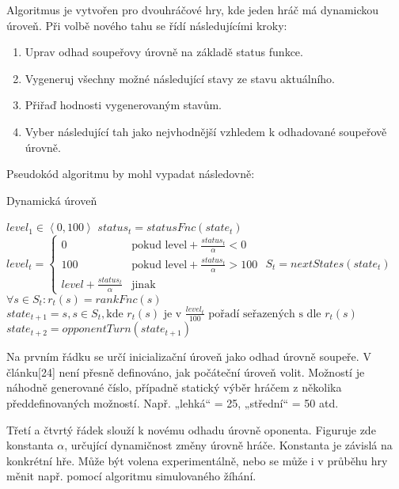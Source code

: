 Algoritmus je vytvořen pro dvouhráčové hry, kde jeden hráč má dynamickou úroveň. Při volbě nového tahu se řídí následujícími kroky:


\begin{enumerate}
	\item Uprav odhad soupeřovy úrovně na základě status funkce.
	\item Vygeneruj všechny možné následující stavy ze stavu aktuálního.
	\item Přiřaď hodnosti vygenerovaným stavům.
	\item Vyber následující tah jako nejvhodnější vzhledem k odhadované soupeřově úrovně.
\end{enumerate}

Pseudokód algoritmu by mohl vypadat následovně:

\begin{algorithm}
\caption{Dynamická úroveň}
\label{alg-dynlevel}
\begin{algorithmic}[1]
\State $level_1 \in \left\langle 0, 100 \right\rangle$
	 \State $status_t = statusFnc(state_t)$
	 \State $level_t = \begin{cases}
											  0 & \text{pokud level} + \frac{status_t}{\alpha} < 0 \\
												100 & \text{pokud level} + \frac{status_t}{\alpha} > 100 \\
												level + \frac{status_t}{\alpha}  & \text{jinak}
										 \end{cases}
						 $
   \State $S_t = nextStates(state_t)$
	 \State $\forall s \in S_t : r_t(s) = rankFnc(s)$
	 \State $state_{t+1} = s, s \in S_t, \text{kde } r_t(s) \text{ je v } \frac{level_t}{100} \text{ pořadí seřazených s dle } r_t(s)$
	 \State $state_{t+2} = opponentTurn(state_{t+1})$
\EndFor
\end{algorithmic}
\end{algorithm}

Na prvním řádku se určí inicializační úroveň jako odhad úrovně soupeře. V článku[24] není přesně definováno, jak počáteční úroveň volit. Možností je náhodně generované číslo, případně statický výběr hráčem z několika předdefinovaných možností. Např. „lehká“ = 25, „střední“ = 50 atd.

Třetí a čtvrtý řádek slouží k novému odhadu úrovně oponenta. Figuruje zde konstanta $\alpha$, určující dynamičnost změny úrovně hráče. Konstanta je závislá na konkrétní hře. Může být volena experimentálně, nebo se může i v průběhu hry měnit např. pomocí algoritmu simulovaného žíhání.

